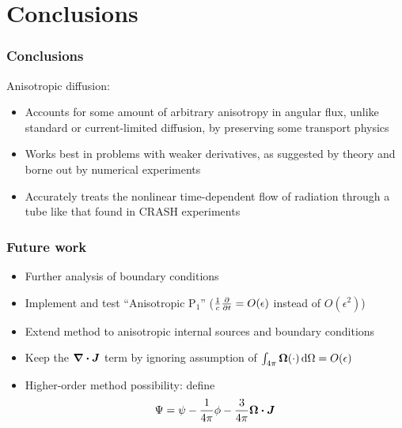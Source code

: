 \documentclass{beamer}
\begin{document}
\section{Conclusions}
\begin{frame}
  \frametitle{Conclusions}
  Anisotropic diffusion:
  \begin{itemize}
    \item Accounts for some amount of arbitrary anisotropy in
      angular flux, unlike standard or current-limited diffusion, by
      preserving some transport physics
    \item Works best in problems with weaker derivatives, as suggested by
      theory and borne out by numerical experiments
    \item Accurately treats the nonlinear time-dependent flow of radiation
      through a tube like that found in CRASH experiments
  \end{itemize}
\end{frame}
\begin{frame}
  \frametitle{Future work}
  \begin{itemize}
    \item Further analysis of boundary conditions
    \item Implement and test ``Anisotropic P$_1$''
      ($\frac1c\frac{\partial }{\partial t}=O(\epsilon)$ instead of $O(\epsilon^2)$)
    \item Extend method to anisotropic internal sources and boundary conditions
    \item Keep the $\bm{\nabla} \bm{\cdot} \bm{J}$ term by ignoring assumption of
      $\int_{4\pi} \bm{\Omega} (\cdot) \mathop{}\!\mathrm{d}\Omega = O(\epsilon)$ 
    \item Higher-order method possibility: define
      \begin{equation*}
        \Psi = \psi - \frac{1}{4\pi} \phi - \frac{3}{4\pi} \bm{\Omega} \bm{\cdot}
        \bm{J}
      \end{equation*}
  \end{itemize}
\end{frame}
\appendix
\end{document}
